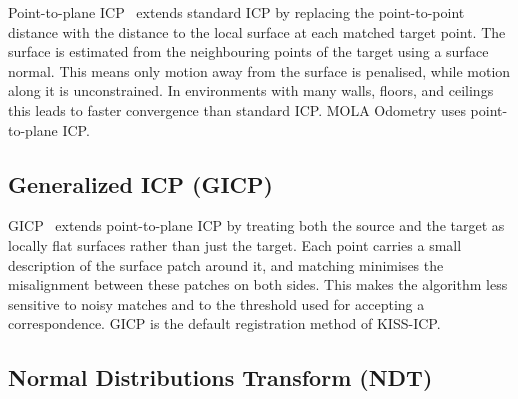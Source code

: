 Point-to-plane ICP~\cite{chen1991point} extends standard ICP by replacing the
point-to-point distance with the distance to the local surface at each matched
target point.
The surface is estimated from the neighbouring points of the target using a
surface normal.
This means only motion away from the surface is penalised, while motion along
it is unconstrained.
In environments with many walls, floors, and ceilings this leads to faster
convergence than standard ICP.
MOLA Odometry uses point-to-plane ICP.


\subsection{Generalized ICP (GICP)}

GICP~\cite{segal2009gicp} extends point-to-plane ICP by treating both the
source and the target as locally flat surfaces rather than just the target.
Each point carries a small description of the surface patch around it, and
matching minimises the misalignment between these patches on both sides.
This makes the algorithm less sensitive to noisy matches and to the threshold
used for accepting a correspondence.
GICP is the default registration method of KISS-ICP.

\subsection{Normal Distributions Transform (NDT)}

